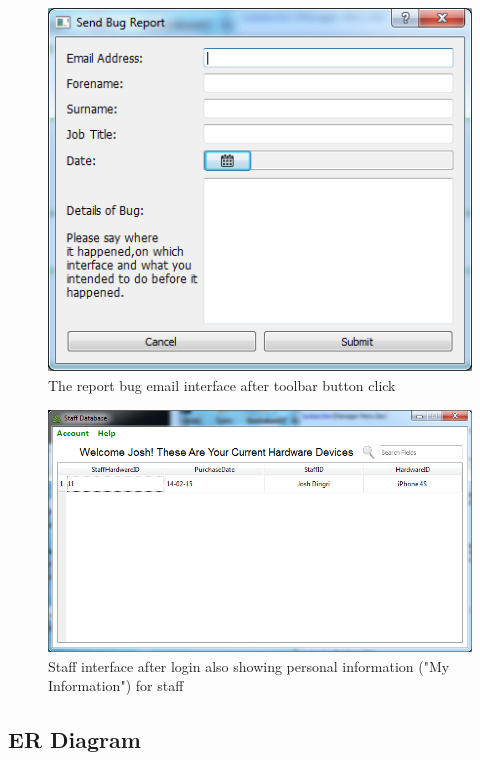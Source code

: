 \begin{figure}[H]
    \includegraphics[width=\textwidth]{./Maintenance/Images/ReportBug.png}
    \caption{The report bug email interface after toolbar button click} \label{fig:ReportBug}
\end{figure}

\begin{figure}[H]
    \includegraphics[width=\textwidth]{./Maintenance/Images/myinfo.png}
    \caption{Staff interface after login also showing personal information ("My Information") for staff} \label{fig:myinfo}
\end{figure}




\subsection{ER Diagram}

